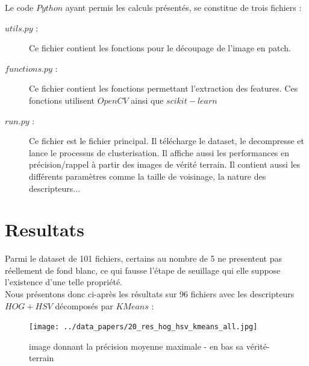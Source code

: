 \documentclass{book}
\begin{document}
Le code $Python$ ayant permis les calculs présentés, se constitue de trois fichiers :
\begin{description} %

\item[$utils.py$ :] Ce fichier contient les fonctions pour le découpage de l'image en patch.
\item[$functions.py$ :] Ce fichier contient les fonctions permettant l'extraction des features. Ces fonctions utilisent $OpenCV$ \cite{opencv_library} ainsi que $scikit-learn$ \cite{scikit-learn}
\item[$run.py$ :] Ce fichier est le fichier principal. Il télécharge le dataset, le decompresse et lance le processus de clusterisation. Il affiche aussi les performances
en précision/rappel à partir des images de vérité terrain. Il contient aussi les différents paramètres comme la taille de voisinage, la nature des descripteurs...

\end{description}


\chapter{Resultats}

Parmi le dataset de 101 fichiers, certains au nombre de 5 ne presentent pas réellement de fond blanc, ce qui fausse l'étape de seuillage qui elle suppose l'existence d'une telle
propriété.\\
Nous présentons donc ci-après les résultats sur 96 fichiers avec les descripteurs $HOG+HSV$ décomposés par $KMeans$ :\\

\begin{figure}[H]
\begin{center}
\texttt{[image: ../data\_papers/20\_res\_hog\_hsv\_kmeans\_all.jpg]}
\end{center}
\caption{image donnant la précision moyenne maximale - en bas sa vérité-terrain}
\label{meilleur_precision}
\end{figure}


\clearpage

\backmatter

\listoftables

\listoffigures



\end{document}
